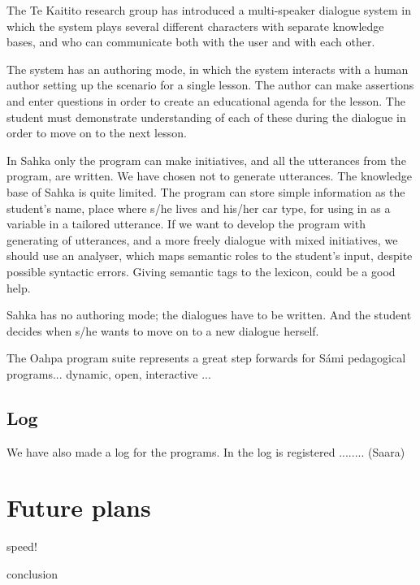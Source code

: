 \documentclass[a4paper,12pt]{article}
\begin{document}
The Te Kaitito research group has introduced a multi-speaker dialogue system in which the system plays several different characters with separate knowledge bases, and who can communicate both with the user and with each other.   
\citep{VlugterKnott06}

The system has an authoring mode, in which the system interacts with a human author setting up the scenario for a single lesson. The author can make assertions and enter questions in order to create an educational agenda for the lesson. The student must demonstrate understanding of each of these during the dialogue in order to move on to the next lesson. \citep{VlugterKnotWeatherall04} \citep{VlugterKnott06}

In Sahka only the program can make initiatives, and all the utterances from the program, are written. We have chosen not to generate utterances. The knowledge base of Sahka is quite limited. The program can store simple information as the student's name, place where s/he lives and his/her car type, for using in as a variable in a tailored utterance. If we want to develop the program with generating of utterances, and a more freely dialogue with mixed initiatives, we should use an analyser, which maps semantic roles to the student's input, despite possible syntactic errors. Giving semantic tags to the lexicon, could be a good help. 

Sahka has no authoring mode; the dialogues have to be written. And the student decides when s/he wants to move on to a new dialogue herself. %
 

The Oahpa program suite represents a great step forwards for Sámi pedagogical programs...
dynamic, open, interactive ...



\subsection{Log}
We have also made a log for the programs. In the log is registered ........ (Saara)


\section{Future plans}


speed!

conclusion
\end{document}
